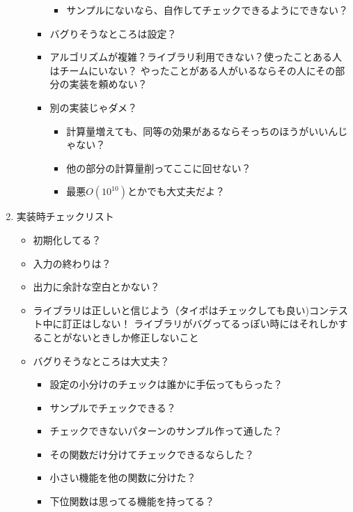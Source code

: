 \documentclass{jsarticle}
\begin{document}
\begin{enumerate}
\begin{itemize}
\begin{itemize}
\begin{itemize}
        \item サンプルにないなら、自作してチェックできるようにできない？
      \end{itemize}
      \item バグりそうなところは設定？
      \item アルゴリズムが複雑？ライブラリ利用できない？使ったことある人はチームにいない？
        \newline やったことがある人がいるならその人にその部分の実装を頼めない？
      \item 別の実装じゃダメ？
      \begin{itemize}
          \item 計算量増えても、同等の効果があるならそっちのほうがいいんじゃない？
          \item 他の部分の計算量削ってここに回せない？
          \item 最悪$O(10^{10})$とかでも大丈夫だよ？
      \end{itemize}
    \end{itemize}
  \end{itemize}
  
  \clearpage
  \item 実装時チェックリスト
  \begin{itemize}
    \item 初期化してる？
    \item 入力の終わりは？
    \item 出力に余計な空白とかない？
    \item ライブラリは正しいと信じよう（タイポはチェックしても良い)コンテスト中に訂正はしない！
      \newline ライブラリがバグってるっぽい時にはそれしかすることがないときしか修正しないこと
    \item バグりそうなところは大丈夫？
    \begin{itemize}
      \item 設定の小分けのチェックは誰かに手伝ってもらった？
      \item サンプルでチェックできる？
      \item チェックできないパターンのサンプル作って通した？
      \item その関数だけ分けてチェックできるならした？
      \item 小さい機能を他の関数に分けた？
      \item 下位関数は思ってる機能を持ってる？
    \end{itemize}
  \end{itemize}
\end{enumerate}
\end{document}
